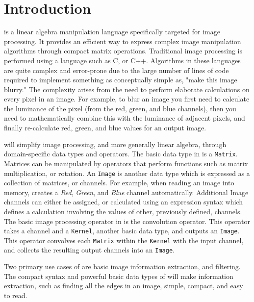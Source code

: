\chapter{Introduction}

\sys{} is a linear algebra manipulation language specifically targeted for
image processing. It provides an efficient way to express complex image
manipulation algorithms through compact matrix operations. Traditional image
processing is performed using a language such as C, or C++. Algorithms in these
languages are quite complex and error-prone due to the large number of lines of
code required to implement something as conceptually simple as, "make this image
blurry." The complexity arises from the need to perform elaborate calculations
on every pixel in an image. For example, to blur an image you first need to
calculate the luminance of the pixel (from the red, green, and blue channels),
then you need to mathematically combine this with the luminance of adjacent pixels,
and finally re-calculate red, green, and blue values for an output image.

\sys{} will simplify image processing, and more generally linear algebra, through
domain-specific data types and operators. The basic data type in \sys{} is a 
\texttt{Matrix}. Matrices can be manipulated by operators that perform functions
such as matrix multiplication, or rotation. An \texttt{Image} is another \sys{}
data type which is expressed as a collection of matrices, or channels. For example,
when reading an image into memory, \sys{} creates a \emph{Red}, \emph{Green}, and
\emph{Blue} channel automatically. Additional Image channels can either be assigned,
or calculated using an expression syntax which defines a calculation involving the
values of other, previously defined, channels. The basic image processing operator
in \sys{} is the convolution operator. This operator takes a channel and a
\texttt{Kernel}, another basic data type, and outputs an \texttt{Image}. This
operator convolves each \texttt{Matrix} within the \texttt{Kernel} with the input channel,
and collects the resulting output channels into an \texttt{Image}.

Two primary use cases of \sys{} are basic image information extraction, and
filtering. The compact syntax and powerful basic data types of \sys{} will make
information extraction, such as finding all the edges in an image, simple, compact,
and easy to read.

